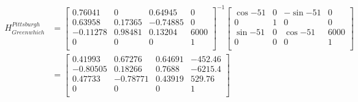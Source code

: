 \documentclass[11pt]{article}
\begin{document}
\begin{align*}
    H^{Pittsburgh}_{Greenwhich}
&= 
\begin{bmatrix}
     0.76041 &       0  &  0.64945  &     0   \\
     0.63958 & 0.17365  & -0.74885  &     0   \\
    -0.11278 & 0.98481  &  0.13204  &  6000   \\
       0     &   0      &    0      & 1       \\
\end{bmatrix}^{-1}
\begin{bmatrix}
    \cos{-51} & 0 & -\sin{-51} & 0 \\
    0&  1 & 0 & 0 \\
    \sin{-51} &0&\cos{-51} & 6000 \\
    0& 0 & 0 & 1 \\
\end{bmatrix}\\
&=
\begin{bmatrix}
     0.41993 &  0.67276 & 0.64691 & -452.46  \\
    -0.80505 &  0.18266 & 0.7688  &  -6215.4 \\
     0.47733 & -0.78771 & 0.43919 &   529.76 \\
       0     &    0     &    0    &    1     \\
\end{bmatrix}
\end{align*}
\end{document}
